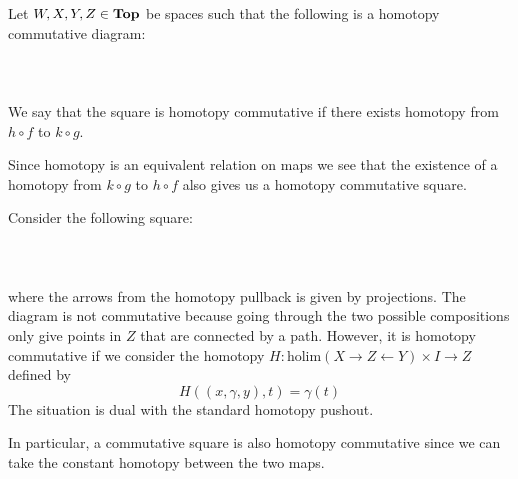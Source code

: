 \begin{defn}\label{defn:Hcomm} Let $W,X,Y,Z\in\bold{Top}$ be spaces such that the following is a homotopy commutative diagram:  
 \\~\\  \\~\\
We say that the square is homotopy commutative if there exists homotopy from $h\circ f$ to $k\circ g$. 
\end{defn}

Since homotopy is an equivalent relation on maps we see that the existence of a homotopy from $k\circ g$ to $h\circ f$ also gives us a homotopy commutative square. 

\begin{eg}\label{eg:HpullIsHcomm} Consider the following square:  
 \\~\\  \\~\\
where the arrows from the homotopy pullback is given by projections. The diagram is not commutative because going through the two possible compositions only give points in $Z$ that are connected by a path. However, it is homotopy commutative if we consider the homotopy $H:\text{holim}(X\rightarrow Z\leftarrow Y)\times I\to Z$ defined by $$H((x,\gamma,y),t)=\gamma(t)$$ The situation is dual with the standard homotopy pushout. 
\end{eg}

In particular, a commutative square is also homotopy commutative since we can take the constant homotopy between the two maps. 

